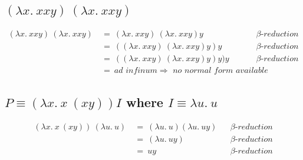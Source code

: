 \documentclass{report}
\begin{document}
		\subsection{$(\lambda x . \ xxy) \ (\lambda x . \ xxy)$}
		\startsection
			\begin{align*}
				(\lambda x . \ xxy) \ (\lambda x . \ xxy) \ & = \ (\lambda x . \ xxy) \ (\lambda x . \ xxy) y  && \beta \textit{-reduction} \\
				& = \ ((\lambda x . \ xxy) \ (\lambda x . \ xxy) y) y  && \beta \textit{-reduction} \\
				& = \ ((\lambda x . \ xxy) \ (\lambda x . \ xxy) y) y) y && \beta \textit{-reduction} \\
				& = \ \textit{ad infinum} \Rightarrow \textit{ no normal form available}
		\end{align*}
		\closesection
		\subsection{$P  \equiv (\lambda x. \ x \ (xy)) I $ where $I \equiv \lambda u. \ u$}
		\startsection
			\begin{align*}
				(\lambda x. \ x \ (xy)) \ (\lambda u. \ u) \ & = \ (\lambda u. \ u) (\lambda u. \ u y) && \beta \textit{-reduction} \\
				& = \ (\lambda u. \ uy) && \beta \textit{-reduction} \\
				& = \ uy && \beta \textit{-reduction} \\
			\end{align*}
		\closesection
	\closesection
\end{document}
